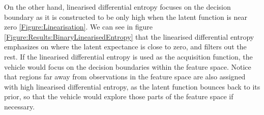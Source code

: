 \documentclass{article}
\begin{document}
		On the other hand, linearised differential entropy focuses on the decision boundary as it is constructed to be only high when the latent function is near zero \ref{Figure:Linearisation}. We can see in figure \ref{Figure:Results:BinaryLinearisedEntropy} that the linearised differential entropy emphasizes on where the latent expectance is close to zero, and filters out the rest. If the linearised differential entropy is used as the acquisition function, the vehicle would focus on the decision boundaries within the feature space. Notice that regions far away from observations in the feature space are also assigned with high linearised differential entropy, as the latent function bounces back to its prior, so that the vehicle would explore those parts of the feature space if necessary.
		
		
%		
		
\end{document}
